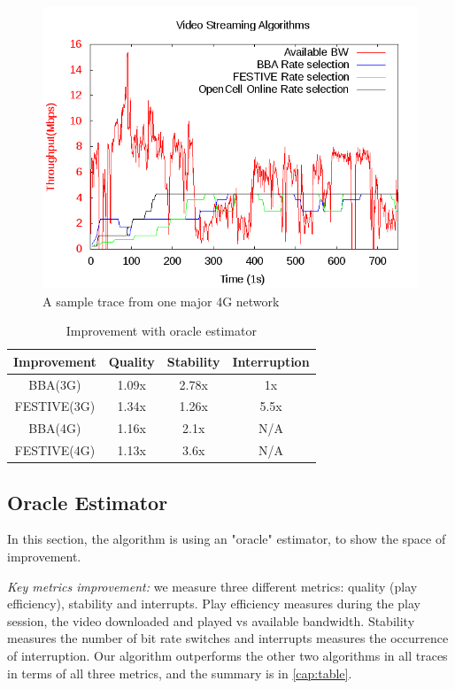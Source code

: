 \begin{figure}[t]
 \includegraphics[width=\linewidth]{pictures/ATT.png}
 \caption{A sample trace from one major 4G network}
\end{figure}

\begin{table}[t]

\begin{tabular} {|c |c |c |c |}
\hline
\textbf{ Improvement} &\textbf{Quality} &\textbf{Stability} & \textbf{Interruption}\\ \hline
BBA(3G)  & 1.09x& 2.78x& 1x \\ \hline
FESTIVE(3G)    & 1.34x & 1.26x&5.5x\\ \hline
BBA(4G) & 1.16x& 2.1x& N/A \\ \hline
FESTIVE(4G) & 1.13x& 3.6x& N/A \\ \hline
\end{tabular}
\centering
\caption{Improvement with oracle estimator} \label{cap:table}
\end{table}


\subsection{Oracle Estimator}\label{sub:oracle}
In this section, the algorithm is using an "oracle" estimator, to show the space of improvement.

\emph{Key metrics improvement:} we measure three different metrics: quality (play efficiency), stability and interrupts. Play efficiency measures during the play session, the video downloaded and played vs available bandwidth. Stability measures the number of bit rate switches and interrupts measures the occurrence of interruption. Our algorithm outperforms the other two algorithms in all traces in terms of all three metrics, and the summary is in \autoref{cap:table}.

